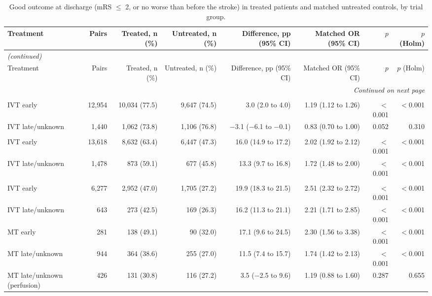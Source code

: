 \begin{landscape}
\begin{longtable}{p{5.6cm}rrrrrrr}
\caption{Good outcome at discharge (mRS $\le$ 2, or no worse than before the stroke) in treated patients and matched untreated controls, by trial group.}\label{tab:supp_outcome_target}\\
\toprule
Treatment & Pairs & Treated, n (\%) & Untreated, n (\%) & Difference, pp (95\% CI) & Matched OR (95\% CI) & $p$ & $p$ (Holm) \\
\midrule
\endfirsthead
\multicolumn{8}{l}{\textit{(continued)}}\\
\toprule
Treatment & Pairs & Treated, n (\%) & Untreated, n (\%) & Difference, pp (95\% CI) & Matched OR (95\% CI) & $p$ & $p$ (Holm) \\
\midrule
\endhead
\midrule
\multicolumn{8}{r}{\textit{Continued on next page}}\\
\endfoot
\bottomrule
\endlastfoot
\multicolumn{8}{l}{\textbf{NIHSS 1--5}}\\
IVT early & 12,954 & 10,034 (77.5) & 9,647 (74.5) & 3.0 (2.0 to 4.0) & 1.19 (1.12 to 1.26) & $<$0.001 & $<$0.001 \\
IVT late/unknown & 1,440 & 1,062 (73.8) & 1,106 (76.8) & $-$3.1 ($-$6.1 to $-$0.1) & 0.83 (0.70 to 1.00) & 0.052 & 0.310 \\
\addlinespace
\multicolumn{8}{l}{\textbf{NIHSS 6--10}}\\
IVT early & 13,618 & 8,632 (63.4) & 6,447 (47.3) & 16.0 (14.9 to 17.2) & 2.02 (1.92 to 2.12) & $<$0.001 & $<$0.001 \\
IVT late/unknown & 1,478 & 873 (59.1) & 677 (45.8) & 13.3 (9.7 to 16.8) & 1.72 (1.48 to 2.00) & $<$0.001 & $<$0.001 \\
\addlinespace
\multicolumn{8}{l}{\textbf{NIHSS 11--15}}\\
IVT early & 6,277 & 2,952 (47.0) & 1,705 (27.2) & 19.9 (18.3 to 21.5) & 2.51 (2.32 to 2.72) & $<$0.001 & $<$0.001 \\
IVT late/unknown & 643 & 273 (42.5) & 169 (26.3) & 16.2 (11.3 to 21.1) & 2.21 (1.71 to 2.85) & $<$0.001 & $<$0.001 \\
MT early & 281 & 138 (49.1) & 90 (32.0) & 17.1 (9.6 to 24.5) & 2.30 (1.56 to 3.38) & $<$0.001 & $<$0.001 \\
MT late/unknown & 944 & 364 (38.6) & 255 (27.0) & 11.5 (7.4 to 15.7) & 1.74 (1.42 to 2.13) & $<$0.001 & $<$0.001 \\
MT late/unknown (perfusion) & 426 & 131 (30.8) & 116 (27.2) & 3.5 ($-$2.5 to 9.6) & 1.19 (0.88 to 1.60) & 0.287 & 0.655 \\

\end{longtable}
\end{landscape}

